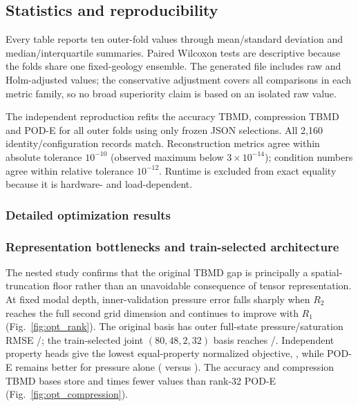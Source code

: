 \subsection{Statistics and reproducibility}
Every table reports ten outer-fold values through mean/standard deviation and median/interquartile summaries. Paired Wilcoxon tests are descriptive because the folds share one fixed-geology ensemble. The generated file  includes raw and Holm-adjusted values; the conservative adjustment covers all comparisons in each metric family, so no broad superiority claim is based on an isolated raw value.

The independent reproduction refits the accuracy TBMD, compression TBMD and POD-E for all outer folds using only frozen JSON selections. All 2,160 identity/configuration records match. Reconstruction metrics agree within absolute tolerance $10^{-10}$ (observed maximum below $3\times10^{-14}$); condition numbers agree within relative tolerance $10^{-12}$. Runtime is excluded from exact equality because it is hardware- and load-dependent.

\subsubsection{Detailed optimization results}


\subsubsection{Representation bottlenecks and train-selected architecture}
The nested study confirms that the original TBMD gap is principally a spatial-truncation floor rather than an unavoidable consequence of tensor representation. At fixed modal depth, inner-validation pressure error falls sharply when $R_2$ reaches the full second grid dimension and continues to improve with $R_1$ (Fig.~\ref{fig:opt_rank}). The original basis has outer full-state pressure/saturation RMSE \OptRepOriginalPressure/\OptRepOriginalSaturation; the train-selected joint $(80,48,2,32)$ basis reaches \OptRepJointPressure/\OptRepJointSaturation. Independent property heads give the lowest equal-property normalized objective, \OptRepAccuracyJoint, while POD-E remains better for pressure alone (\OptRepPodePressure{} versus \OptRepAccuracyPressure). The accuracy and compression TBMD bases store \OptAccuracyCompression{} and \OptCompressionCompression{} times fewer values than rank-32 POD-E (Fig.~\ref{fig:opt_compression}).

